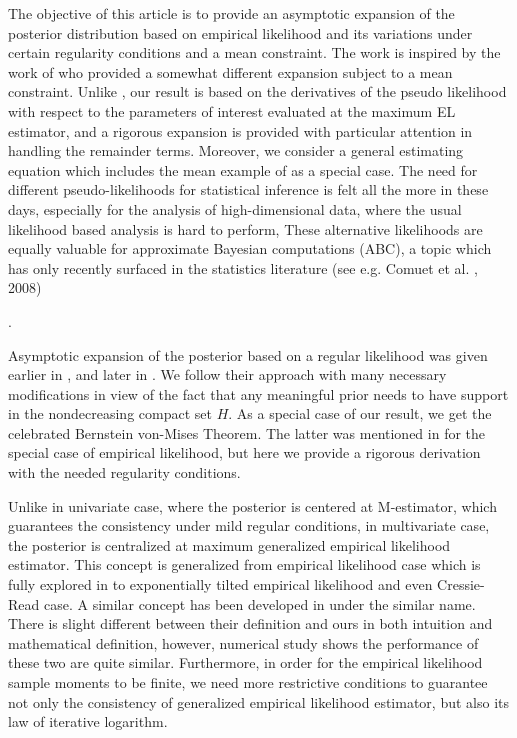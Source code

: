 The objective of this article is to provide an asymptotic expansion
of the posterior distribution based on empirical likelihood and its
variations under certain regularity conditions and a mean constraint.
The work is inspired by the work of \citet{fang2006empirical} who
provided a somewhat different expansion subject to a mean constraint.
Unlike \citet{fang2005expected,fang2006empirical}, our result is
based on the derivatives of the pseudo likelihood with respect to
the parameters of interest evaluated at the maximum EL estimator,
and a rigorous expansion is provided with particular attention in
handling the remainder terms. Moreover, we consider a general estimating
equation which includes the mean example of \citet{fang2006empirical}
as a special case. The need for different pseudo-likelihoods for statistical
inference is felt all the more in these days, especially for the analysis
of high-dimensional data, where the usual likelihood based analysis
is hard to perform, These alternative likelihoods are equally valuable
for approximate Bayesian computations (ABC), a topic which has only
recently surfaced in the statistics literature (see e.g. Comuet et
al. , 2008)%
\begin{comment}
paper not found or cornuet 2008
\end{comment}
.

Asymptotic expansion of the posterior based on a regular likelihood
was given earlier in \citet{johnson1970asymptotic}, and later in
\citet{ghosh1982expansions}. We follow their approach with many necessary
modifications in view of the fact that any meaningful prior needs
to have support in the nondecreasing compact set $H$. As a special
case of our result, we get the celebrated Bernstein von-Mises Theorem.
The latter was mentioned in \citet{lazar2003bayesian} for the special
case of empirical likelihood, but here we provide a rigorous  derivation
with the needed regularity conditions. 

Unlike in univariate case, where the posterior is centered at M-estimator,
which guarantees the consistency under mild regular conditions, in
multivariate case, the posterior is centralized at maximum generalized
empirical likelihood estimator. This concept is generalized from empirical
likelihood case which is fully explored in \citet{qin1994empirical}
to exponentially tilted empirical likelihood and even Cressie-Read
case. A similar concept has been developed in \citet{newey2004higher}
under the similar name. There is slight different between their definition
and ours in both intuition and mathematical definition, however, numerical
study shows the performance of these two are quite similar. Furthermore,
in order for the empirical likelihood sample moments to be finite,
we need more restrictive conditions to guarantee not only the consistency
of generalized empirical likelihood estimator, but also its law of
iterative logarithm. 

